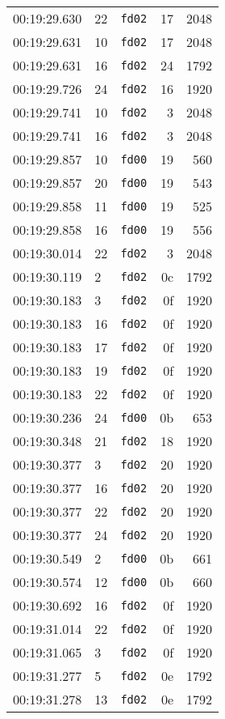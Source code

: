 \documentclass{article}
\begin{document}
\begin{longtable}{lllrr}
00:19:29.630 & 22 & \texttt{fd02} & 17 & 2048 \\
00:19:29.631 & 10 & \texttt{fd02} & 17 & 2048 \\
00:19:29.631 & 16 & \texttt{fd02} & 24 & 1792 \\
00:19:29.726 & 24 & \texttt{fd02} & 16 & 1920 \\
00:19:29.741 & 10 & \texttt{fd02} & 3 & 2048 \\
00:19:29.741 & 16 & \texttt{fd02} & 3 & 2048 \\
00:19:29.857 & 10 & \texttt{fd00} & 19 & 560 \\
00:19:29.857 & 20 & \texttt{fd00} & 19 & 543 \\
00:19:29.858 & 11 & \texttt{fd00} & 19 & 525 \\
00:19:29.858 & 16 & \texttt{fd00} & 19 & 556 \\
00:19:30.014 & 22 & \texttt{fd02} & 3 & 2048 \\
00:19:30.119 & 2 & \texttt{fd02} & 0c & 1792 \\
00:19:30.183 & 3 & \texttt{fd02} & 0f & 1920 \\
00:19:30.183 & 16 & \texttt{fd02} & 0f & 1920 \\
00:19:30.183 & 17 & \texttt{fd02} & 0f & 1920 \\
00:19:30.183 & 19 & \texttt{fd02} & 0f & 1920 \\
00:19:30.183 & 22 & \texttt{fd02} & 0f & 1920 \\
00:19:30.236 & 24 & \texttt{fd00} & 0b & 653 \\
00:19:30.348 & 21 & \texttt{fd02} & 18 & 1920 \\
00:19:30.377 & 3 & \texttt{fd02} & 20 & 1920 \\
00:19:30.377 & 16 & \texttt{fd02} & 20 & 1920 \\
00:19:30.377 & 22 & \texttt{fd02} & 20 & 1920 \\
00:19:30.377 & 24 & \texttt{fd02} & 20 & 1920 \\
00:19:30.549 & 2 & \texttt{fd00} & 0b & 661 \\
00:19:30.574 & 12 & \texttt{fd00} & 0b & 660 \\
00:19:30.692 & 16 & \texttt{fd02} & 0f & 1920 \\
00:19:31.014 & 22 & \texttt{fd02} & 0f & 1920 \\
00:19:31.065 & 3 & \texttt{fd02} & 0f & 1920 \\
00:19:31.277 & 5 & \texttt{fd02} & 0e & 1792 \\
00:19:31.278 & 13 & \texttt{fd02} & 0e & 1792 \\

\end{longtable}
\end{document}
